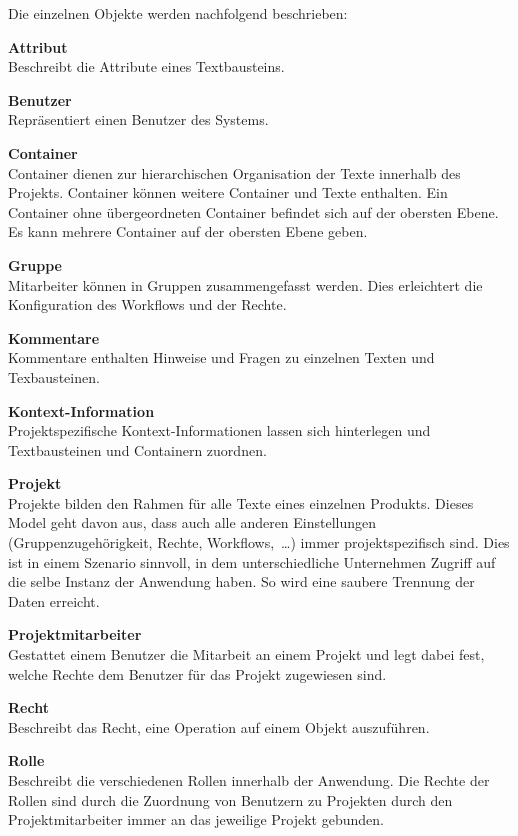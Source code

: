 Die einzelnen Objekte werden nachfolgend beschrieben:

\textsf{\textbf{Attribut}}\\Beschreibt die Attribute eines Textbausteins.

\textsf{\textbf{Benutzer}}\\Repräsentiert einen Benutzer des Systems.

\textsf{\textbf{Container}}\\Container dienen zur hierarchischen Organisation der Texte innerhalb des Projekts. Container können weitere Container und Texte enthalten. Ein Container ohne übergeordneten Container befindet sich auf der obersten Ebene. Es kann mehrere Container auf der obersten Ebene geben.

\textsf{\textbf{Gruppe}}\\Mitarbeiter können in Gruppen zusammengefasst werden. Dies erleichtert die Konfiguration des Workflows und der Rechte.

\textsf{\textbf{Kommentare}}\\Kommentare enthalten Hinweise und Fragen zu einzelnen Texten und Texbausteinen.

\textsf{\textbf{Kontext-Information}}\\Projektspezifische Kontext-Informationen lassen sich hinterlegen und Textbausteinen und Containern zuordnen.

\textsf{\textbf{Projekt}}\\Projekte bilden den Rahmen für alle Texte eines einzelnen Produkts. Dieses Model geht davon aus, dass auch alle anderen Einstellungen (Gruppenzugehörigkeit, Rechte, Workflows,~…) immer projektspezifisch sind. Dies ist in einem Szenario sinnvoll, in dem unterschiedliche Unternehmen Zugriff auf die selbe Instanz der Anwendung haben. So wird eine saubere Trennung der Daten erreicht.

\textsf{\textbf{Projektmitarbeiter}}\\Gestattet einem Benutzer die Mitarbeit an einem Projekt und legt dabei fest, welche Rechte dem Benutzer für das Projekt zugewiesen sind.

\textsf{\textbf{Recht}}\\Beschreibt das Recht, eine Operation auf einem Objekt auszuführen.

\textsf{\textbf{Rolle}}\\Beschreibt die verschiedenen Rollen innerhalb der Anwendung. Die Rechte der Rollen sind durch die Zuordnung von Benutzern zu Projekten durch den Projektmitarbeiter immer an das jeweilige Projekt gebunden.

